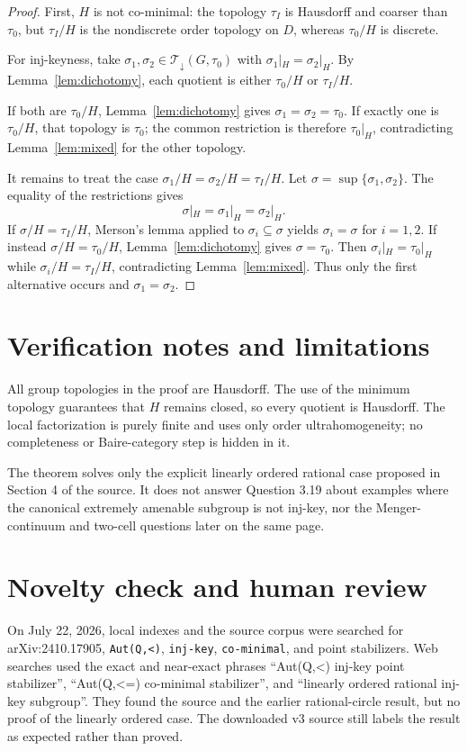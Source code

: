 \documentclass[11pt]{article}
\newcommand{\Tdown}{\mathcal T_{\downarrow}}
\begin{document}
\begin{proof}
First, $H$ is not co-minimal: the topology $\tau_I$ is Hausdorff and coarser
than $\tau_0$, but $\tau_I/H$ is the nondiscrete order topology on $D$,
whereas $\tau_0/H$ is discrete.

For inj-keyness, take $\sigma_1,\sigma_2\in\Tdown(G,\tau_0)$ with
$\sigma_1|_H=\sigma_2|_H$.  By Lemma~\ref{lem:dichotomy}, each quotient is
either $\tau_0/H$ or $\tau_I/H$.

If both are $\tau_0/H$, Lemma~\ref{lem:dichotomy} gives
$\sigma_1=\sigma_2=\tau_0$.  If exactly one is $\tau_0/H$, that topology is
$\tau_0$; the common restriction is therefore $\tau_0|_H$, contradicting
Lemma~\ref{lem:mixed} for the other topology.

It remains to treat the case
$\sigma_1/H=\sigma_2/H=\tau_I/H$.  Let
$\sigma=\sup\{\sigma_1,\sigma_2\}$.  The equality of the restrictions gives
\[
 \sigma|_H=\sigma_1|_H=\sigma_2|_H.
\]
If $\sigma/H=\tau_I/H$, Merson's lemma applied to
$\sigma_i\subseteq\sigma$ yields $\sigma_i=\sigma$ for $i=1,2$.  If instead
$\sigma/H=\tau_0/H$, Lemma~\ref{lem:dichotomy} gives $\sigma=\tau_0$.
Then $\sigma_i|_H=\tau_0|_H$ while $\sigma_i/H=\tau_I/H$, contradicting
Lemma~\ref{lem:mixed}.  Thus only the first alternative occurs and
$\sigma_1=\sigma_2$.
\end{proof}

\section*{Verification notes and limitations}

All group topologies in the proof are Hausdorff.  The use of the minimum
topology guarantees that $H$ remains closed, so every quotient is Hausdorff.
The local factorization is purely finite and uses only order
ultrahomogeneity; no completeness or Baire-category step is hidden in it.

The theorem solves only the explicit linearly ordered rational case proposed
in Section 4 of the source.  It does not answer Question 3.19 about examples
where the canonical extremely amenable subgroup is not inj-key, nor the
Menger-continuum and two-cell questions later on the same page.

\section*{Novelty check and human review}

On July 22, 2026, local indexes and the source corpus were searched for
arXiv:2410.17905, \texttt{Aut(Q,<)}, \texttt{inj-key},
\texttt{co-minimal}, and point stabilizers.  Web searches used the exact and
near-exact phrases ``Aut(Q,<) inj-key point stabilizer'', ``Aut(Q,<=)
co-minimal stabilizer'', and ``linearly ordered rational inj-key subgroup''.
They found the source and the earlier rational-circle result, but no proof of
the linearly ordered case.  The downloaded v3 source still labels the result
as expected rather than proved.
\end{document}
